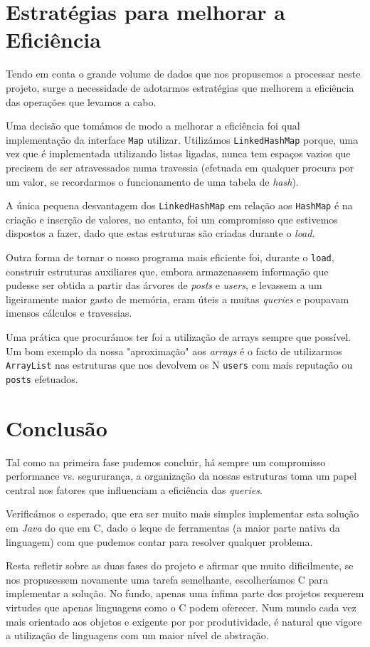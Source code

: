 \documentclass[10pt]{article}
\begin{document}
			
\pagebreak

\section{Estratégias para melhorar a Eficiência}
		Tendo em conta o grande volume de dados que nos propusemos a processar neste projeto,
	surge a necessidade de adotarmos estratégias que melhorem a eficiência das operações que
	levamos a cabo.
	
			Uma decisão que tomámos de modo a melhorar a eficiência
	foi qual implementação da interface \texttt{Map} utilizar.
	Utilizámos \texttt{LinkedHashMap} porque, uma vez que é 
	implementada utilizando listas ligadas, nunca tem espaços vazios 
	que precisem de ser atravessados numa travessia (efetuada 
	em qualquer procura por um valor, se recordarmos o funcionamento 
	de uma tabela de \textit{hash}). 
	
		A única pequena desvantagem dos
	\texttt{LinkedHashMap} em relação aos \texttt{HashMap} é na 
	criação e inserção de valores, no entanto, foi um compromisso que 
	estivemos dispostos a fazer, dado que estas estruturas são criadas 
	durante o \textit{load}.
	
		Outra forma de tornar o nosso programa mais eficiente foi, 
	durante o \texttt{load}, construir estruturas auxiliares que, 
	embora armazenassem informação que pudesse ser obtida a partir 
	das árvores de \textit{posts} e \textit{users}, e levassem a um 
	ligeiramente maior gasto de memória, eram úteis a muitas 
	\textit{queries} e poupavam imensos cálculos e travessias.
	
	
		Uma prática que procurámos ter foi a utilização de arrays 
	sempre que possível. Um bom exemplo da nossa "aproximação" aos 
	\textit{arrays} é o facto de utilizarmos \texttt{ArrayList} nas 
	estruturas que nos devolvem os N \texttt{users} com mais reputação 
	ou \texttt{posts} efetuados.




\section{Conclusão}
	Tal como na primeira fase pudemos concluir, há sempre um 
compromisso performance vs. segururança, a organização da nossas 
estruturas toma um papel central nos fatores que influenciam a 
eficiência das \textit{queries}.
	
		
	Verificámos o esperado, que era ser muito mais simples implementar 
esta solução em \textit{Java} do que em C, dado o leque de ferramentas 
(a maior parte nativa da linguagem) com que pudemos contar para 
resolver qualquer problema.

	Resta refletir sobre as duas fases do projeto e afirmar que 
muito dificilmente, se nos propusessem novamente uma tarefa 
semelhante, escolheríamos C para implementar a solução. No fundo, 
apenas uma ínfima parte dos projetos requerem virtudes que apenas 
linguagens como o C podem oferecer. Num mundo cada vez mais 
orientado aos objetos e exigente por por produtividade, é natural 
que vigore a utilização de linguagens com um maior nível de abstração.
\end{document}
